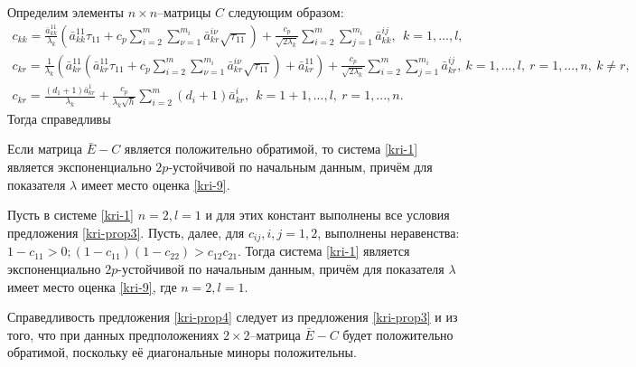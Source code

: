 Определим элементы $n\times n$--матрицы $C$ следующим образом:
$$
\begin{array}{crl}
c_{kk}  = \frac{\bar a^{11}_{kk}}{\lambda _k }\left(\bar
a^{11}_{kk}\tau _{11}  + c_p\sum \limits_{i=2}^m \sum
\limits_{\nu=1}^{m_i}\bar a^{i\nu}_{kr}\sqrt{\tau _{11}}\right ) +
\frac{c_p}{\sqrt{2\lambda_k }}\sum
\limits_{i=2}^m \sum \limits_{j=1}^{m_i}\bar a^{ij}_{kk}, \ \ k = 1,...,l,\\
c_{kr}\! =\! \frac{1}{\lambda _k }\left(\bar a^{11}_{kr}\left(\bar
a^{11}_{kr} \tau _{11}\! +\! c_p\sum \limits_{i=2}^m \sum
\limits_{\nu=1}^{m_i}\bar a^{i\nu}_{kr}\sqrt{\tau _{11}}\right)\!
+\! \bar a^{11}_{kr}\right)\!+\! \frac{c_p}{\sqrt{2\lambda_k }}\sum
\limits_{i=2}^m \sum \limits_{j=1}^{m_i}\bar a^{ij}_{kr}, \ k \!=\!
1,...,l,\ r \!=\! 1,..., n, \ k \!\neq\! r,\\
 c_{kr} = \frac{(d_1+1)\bar a^{1}_{kr}}{\lambda_k} +
\frac{c_p}{\lambda_k\sqrt{h}} \sum \limits _{i=2}^{m}\mathrel (d_i +
1)\bar a^{i}_{kr}, \ \ k = 1 + 1,...,l,\ r = 1,...,n.
\end {array}
$$
Тогда справедливы

\begin{proposition}\label{kri-prop3}
Если матрица $\bar E - C$ является
положительно обратимой, то система \eqref{kri-1} является экспоненциально
${2p}$-устойчивой по начальным данным, причём для показателя
$\lambda$ имеет место оценка \eqref{kri-9}.
\end{proposition}

\begin{proposition}\label{kri-prop4}
Пусть в системе \eqref{kri-1} $n = 2, l = 1$ и для этих констант выполнены все условия предложения \ref{kri-prop3}. Пусть, далее, для $c_{ij}, i,j = 1, 2$, выполнены неравенства: $ 1 - c_{11} > 0; (1 - c_{11})(1 - c_{22}) > c_{12}c_{21}$. Тогда система \eqref{kri-1}
является экспоненциально ${2p}$-устойчивой по начальным данным,
причём для показателя  $\lambda$ имеет место оценка \eqref{kri-9}, где $n = 2,
l = 1$.
\end{proposition}
Справедливость предложения \ref{kri-prop4} следует из предложения \ref{kri-prop3} и из того, что
при данных предположениях $2\times 2$--матрица $\bar E - C$ будет
положительно обратимой, поскольку её диагональные миноры
положительны.

